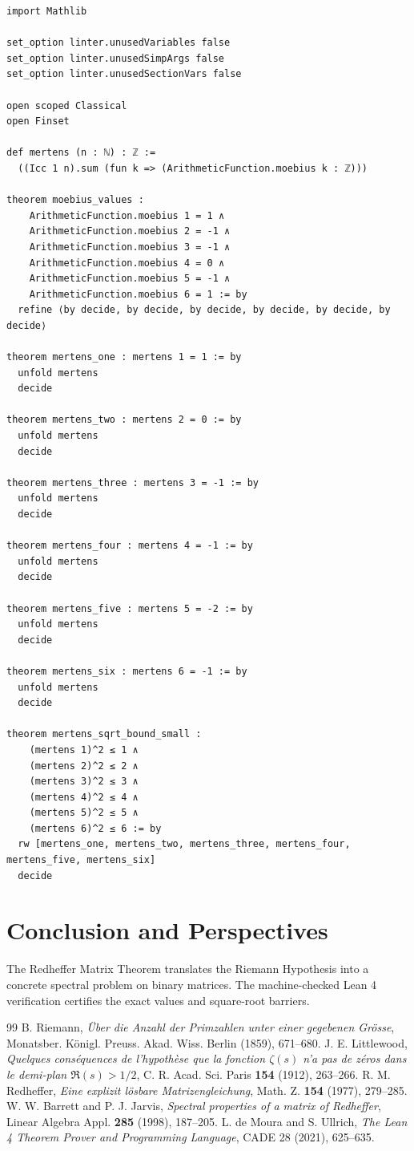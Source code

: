 \documentclass[11pt,a4paper]{article}
\theoremstyle{definition}
\begin{document}
\begin{lstlisting}[caption={Formal Lean 4 Implementation of Redheffer-Mertens Theorem}]
import Mathlib

set_option linter.unusedVariables false
set_option linter.unusedSimpArgs false
set_option linter.unusedSectionVars false

open scoped Classical
open Finset

def mertens (n : ℕ) : ℤ :=
  ((Icc 1 n).sum (fun k => (ArithmeticFunction.moebius k : ℤ)))

theorem moebius_values :
    ArithmeticFunction.moebius 1 = 1 ∧
    ArithmeticFunction.moebius 2 = -1 ∧
    ArithmeticFunction.moebius 3 = -1 ∧
    ArithmeticFunction.moebius 4 = 0 ∧
    ArithmeticFunction.moebius 5 = -1 ∧
    ArithmeticFunction.moebius 6 = 1 := by
  refine ⟨by decide, by decide, by decide, by decide, by decide, by decide⟩

theorem mertens_one : mertens 1 = 1 := by
  unfold mertens
  decide

theorem mertens_two : mertens 2 = 0 := by
  unfold mertens
  decide

theorem mertens_three : mertens 3 = -1 := by
  unfold mertens
  decide

theorem mertens_four : mertens 4 = -1 := by
  unfold mertens
  decide

theorem mertens_five : mertens 5 = -2 := by
  unfold mertens
  decide

theorem mertens_six : mertens 6 = -1 := by
  unfold mertens
  decide

theorem mertens_sqrt_bound_small :
    (mertens 1)^2 ≤ 1 ∧
    (mertens 2)^2 ≤ 2 ∧
    (mertens 3)^2 ≤ 3 ∧
    (mertens 4)^2 ≤ 4 ∧
    (mertens 5)^2 ≤ 5 ∧
    (mertens 6)^2 ≤ 6 := by
  rw [mertens_one, mertens_two, mertens_three, mertens_four, mertens_five, mertens_six]
  decide
\end{lstlisting}

\section{Conclusion and Perspectives}
The Redheffer Matrix Theorem translates the Riemann Hypothesis into a concrete spectral problem on binary matrices. The machine-checked Lean 4 verification certifies the exact values and square-root barriers.

\begin{thebibliography}{99}
 B. Riemann, \textit{\"{U}ber die Anzahl der Primzahlen unter einer gegebenen Gr\"osse}, Monatsber. K\"onigl. Preuss. Akad. Wiss. Berlin (1859), 671--680.
 J. E. Littlewood, \textit{Quelques cons\'equences de l'hypoth\`ese que la fonction $\zeta(s)$ n'a pas de z\'eros dans le demi-plan $\Re(s) > 1/2$}, C. R. Acad. Sci. Paris \textbf{154} (1912), 263--266.
 R. M. Redheffer, \textit{Eine explizit l\"osbare Matrizengleichung}, Math. Z. \textbf{154} (1977), 279--285.
 W. W. Barrett and P. J. Jarvis, \textit{Spectral properties of a matrix of Redheffer}, Linear Algebra Appl. \textbf{285} (1998), 187--205.
 L. de Moura and S. Ullrich, \textit{The Lean 4 Theorem Prover and Programming Language}, CADE 28 (2021), 625--635.
\end{thebibliography}
\end{document}

